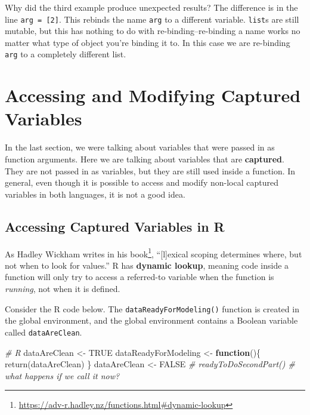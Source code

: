 \documentclass[
  12pt,
]{krantz}
\makeatletter
\newenvironment{Shaded}{\begin{snugshade}}{\end{snugshade}}
\newcommand{\CommentTok}[1]{\textcolor[rgb]{0.37,0.37,0.37}{\textit{#1}}}
\newcommand{\ConstantTok}[1]{\textcolor[rgb]{0,0,0}{#1}}
\newcommand{\ControlFlowTok}[1]{\textcolor[rgb]{0.27,0.27,0.27}{\textbf{#1}}}
\newcommand{\FunctionTok}[1]{\textcolor[rgb]{0,0,0}{#1}}
\newcommand{\NormalTok}[1]{#1}
\newcommand{\OtherTok}[1]{\textcolor[rgb]{0.37,0.37,0.37}{#1}}
\renewcommand{\href}[2]{#2\footnote{\url{#1}}}
\newenvironment{kframe}{%
\medskip{}
\setlength{\fboxsep}{.8em}
 \def\at@end@of@kframe{}%
 \ifinner\ifhmode%
  \def\at@end@of@kframe{\end{minipage}}%
  \begin{minipage}{\columnwidth}%
 \fi\fi%
 \def\FrameCommand##1{\hskip\@totalleftmargin \hskip-\fboxsep
 \colorbox{shadecolor}{##1}\hskip-\fboxsep
     \hskip-\linewidth \hskip-\@totalleftmargin \hskip\columnwidth}%
 \MakeFramed {\advance\hsize-\width
   \@totalleftmargin\z@ \linewidth\hsize
   \@setminipage}}%
 {\par\unskip\endMakeFramed%
 \at@end@of@kframe}
\renewenvironment{Shaded}{\begin{kframe}}{\end{kframe}}
\makeatother
\begin{document}
Why did the third example produce unexpected results? The difference is in the line \texttt{arg\ =\ {[}2{]}}. This rebinds the name \texttt{arg} to a different variable. \texttt{list}s are still mutable, but this has nothing to do with re-binding--re-binding a name works no matter what type of object you're binding it to. In this case we are re-binding \texttt{arg} to a completely different list.

\hypertarget{accessing-and-modifying-captured-variables}{%
\section{Accessing and Modifying Captured Variables}\label{accessing-and-modifying-captured-variables}}

In the last section, we were talking about variables that were passed in as function arguments. Here we are talking about variables that are \textbf{captured}. They are not passed in as variables, but they are still used inside a function. In general, even though it is possible to access and modify non-local captured variables in both languages, it is not a good idea.

\hypertarget{accessing-captured-variables-in-r}{%
\subsection{Accessing Captured Variables in R}\label{accessing-captured-variables-in-r}}

As Hadley Wickham writes in \href{https://adv-r.hadley.nz/functions.html\#dynamic-lookup}{his book}, ``{[}l{]}exical scoping determines where, but not when to look for values.'' R has \textbf{dynamic lookup}, meaning code inside a function will only try to access a referred-to variable when the function is \emph{running}, not when it is defined.

Consider the R code below. The \texttt{dataReadyForModeling()} function is created in the global environment, and the global environment contains a Boolean variable called \texttt{dataAreClean}.

\begin{Shaded}
\begin{Highlighting}[]
\CommentTok{\# R}
\NormalTok{dataAreClean }\OtherTok{\textless{}{-}} \ConstantTok{TRUE}
\NormalTok{dataReadyForModeling }\OtherTok{\textless{}{-}} \ControlFlowTok{function}\NormalTok{()\{}
  \FunctionTok{return}\NormalTok{(dataAreClean)}
\NormalTok{\}}
\NormalTok{dataAreClean }\OtherTok{\textless{}{-}} \ConstantTok{FALSE}
\CommentTok{\# readyToDoSecondPart() \# what happens if we call it now?}
\end{Highlighting}
\end{Shaded}
\end{document}
